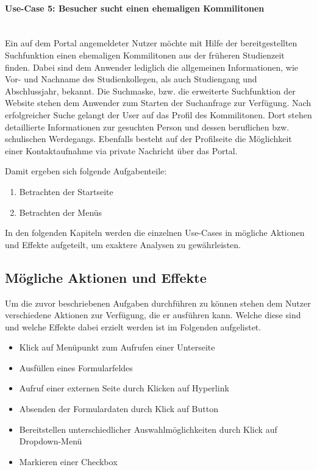 \paragraph{Use-Case 5: Besucher sucht einen ehemaligen Kommilitonen}\quad \\
Ein auf dem Portal angemeldeter Nutzer möchte mit Hilfe der bereitgestellten Suchfunktion einen ehemaligen Kommilitonen aus der früheren Studienzeit finden. Dabei sind dem Anwender lediglich die allgemeinen Informationen, wie Vor- und Nachname des Studienkollegen, als auch Studiengang und Abschlussjahr, bekannt. Die Suchmaske, bzw. die erweiterte Suchfunktion der Website stehen dem Anwender zum Starten der Suchanfrage zur Verfügung. Nach erfolgreicher Suche gelangt der User auf das Profil des Kommilitonen. Dort stehen detaillierte Informationen zur gesuchten Person und dessen beruflichen bzw. schulischen Werdegangs. Ebenfalls besteht auf der Profilseite die Möglichkeit einer Kontaktaufnahme via private Nachricht über das Portal.

Damit ergeben sich folgende Aufgabenteile:
\begin{enumerate}
	\item Betrachten der Startseite
	\item Betrachten der Menüs
\end{enumerate}


In den folgenden Kapiteln werden die einzelnen Use-Cases in mögliche Aktionen und Effekte aufgeteilt, um exaktere Analysen zu gewährleisten.

\subsection{Mögliche Aktionen und Effekte}
Um die zuvor beschriebenen Aufgaben durchführen zu können stehen dem Nutzer verschiedene Aktionen zur Verfügung, die er ausführen kann. Welche diese sind und welche Effekte dabei erzielt werden ist im Folgenden aufgelistet.

\begin{itemize}
\item Klick auf Menüpunkt zum Aufrufen einer Unterseite
\item Ausfüllen eines Formularfeldes
\item Aufruf einer externen Seite durch Klicken auf Hyperlink
\item Absenden der Formulardaten durch Klick auf Button
\item Bereitstellen unterschiedlicher Auswahlmöglichkeiten durch Klick auf Dropdown-Menü
\item Markieren einer Checkbox
\end{itemize}